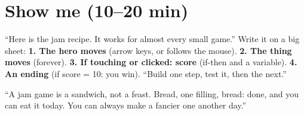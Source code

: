 \section{Show me (10--20 min)}
\begin{teacherscript}
\enquote{Here is the jam recipe. It works for almost every small game.} Write it on a big sheet: \textbf{1. The hero moves} (arrow keys, or follows the mouse). \textbf{2. The thing moves} (forever). \textbf{3. If touching or clicked: score} (if-then and a variable). \textbf{4. An ending} (if score = 10: you win). \enquote{Build one step, test it, then the next.}
\end{teacherscript}

\begin{analogy}
\enquote{A jam game is a sandwich, not a feast. Bread, one filling, bread: done, and you can eat it today. You can always make a fancier one another day.}
\end{analogy}

